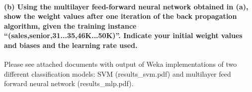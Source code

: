 \documentclass[11pt]{article}
\begin{document}
    \paragraph{(b) Using the multilayer feed-forward neural network obtained
in (a), show the weight values after one iteration of the back
propagation algorithm, given the training instance
``(sales,senior,31...35,46K...50K)''. Indicate your initial weight
values and biases and the learning rate
used.}\label{b-using-the-multilayer-feed-forward-neural-network-obtained-in-a-show-the-weight-values-after-one-iteration-of-the-back-propagation-algorithm-given-the-training-instance-salessenior31...3546k...50k.-indicate-your-initial-weight-values-and-biases-and-the-learning-rate-used.}

    Please see attached documents with output of Weka implementations of two
different classification models: SVM (results\_svm.pdf) and multilayer
feed forward neural network (results\_mlp.pdf).


    
    
    
    
\end{document}
